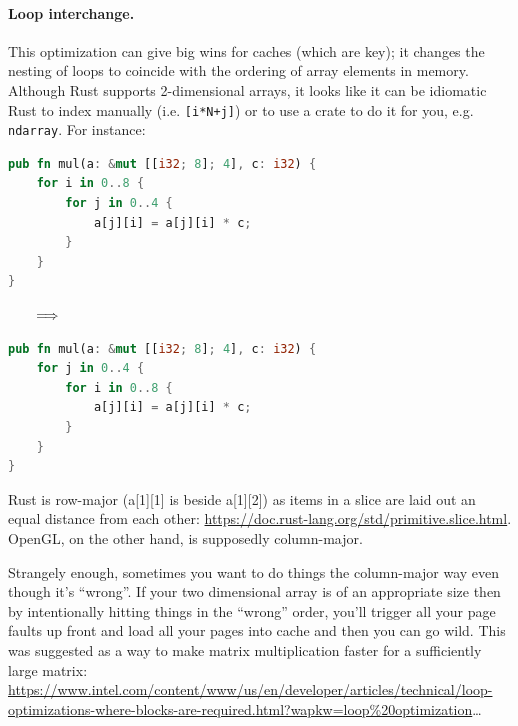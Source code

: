 \documentclass[a4paper]{report}
\begin{document}
\paragraph{Loop interchange.} This optimization can give big wins
for caches (which are key); it changes the nesting of loops to
coincide with the ordering of array elements in memory. Although Rust
supports 2-dimensional arrays, it looks like it can be idiomatic Rust to index
manually (i.e. \texttt{[i*N+j]}) or to use a crate to do it for you, e.g.
\texttt{ndarray}.
For instance:
\begin{center}
\vspace*{-1em}
\begin{minipage}{.39\textwidth}
  \begin{lstlisting}[language=Rust]
pub fn mul(a: &mut [[i32; 8]; 4], c: i32) {
    for i in 0..8 {
        for j in 0..4 {
            a[j][i] = a[j][i] * c;
        }
    }
}
  \end{lstlisting}
  \end{minipage} $\hspace*{2em} \Longrightarrow \hspace*{2em}$ \begin{minipage}{.4\textwidth}
  \begin{lstlisting}[language=Rust]
pub fn mul(a: &mut [[i32; 8]; 4], c: i32) {
    for j in 0..4 {
        for i in 0..8 {
            a[j][i] = a[j][i] * c;
        }
    }
}
  \end{lstlisting}
  \end{minipage}
  \end{center}
  Rust is row-major (a[1][1] is beside a[1][2]) as items in a slice are laid out an equal distance from each other: {\scriptsize \url{https://doc.rust-lang.org/std/primitive.slice.html}}. OpenGL, on the other hand, is supposedly column-major.

Strangely enough, sometimes you want to do things the column-major way even though it's ``wrong''. If your two dimensional array is of an appropriate size then by intentionally hitting things in the ``wrong'' order, you'll trigger all your page faults up front and load all your pages into cache and then you can go wild. This was suggested as a way to make matrix multiplication faster for a sufficiently large matrix: {\scriptsize \url{https://www.intel.com/content/www/us/en/developer/articles/technical/loop-optimizations-where-blocks-are-required.html?wapkw=loop%20optimization}}\ldots
\end{document}
